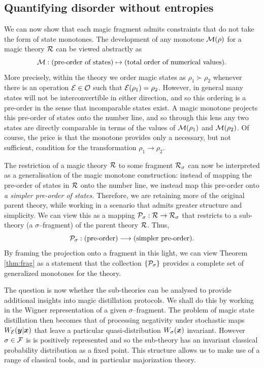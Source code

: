 \documentclass[pra,
aps,
twocolumn,
superscriptaddress,
groupedaddress,
nofootinbib,
reprint
]{revtex4-1}
\begin{document}
\subsection{Quantifying disorder without entropies}
\label{sec:major}

We can now show that each magic fragment admits constraints that do not take the form of state monotones. The development of any monotone $\M(\rho)$ for a magic theory $\R$ can be viewed abstractly as
\begin{equation}
\M : \mbox{(pre-order of states)} \mapsto \mbox{(total order of numerical values).} \nonumber
\end{equation}
More precisely, within the theory we order magic states as $\rho_1 \succ \rho_2$ whenever there is an operation $\E \in \O$ such that $\E(\rho_1) = \rho_2$. However, in general many states will not be interconvertible in either direction, and so this ordering is a pre-order in the sense that incomparable states exist. A magic monotone projects this pre-order of states onto the number line, and so through this lens any two states are directly comparable in terms of the values of $\M(\rho_1)$ and $\M(\rho_2)$. Of course, the price is that the monotone provides only a necessary, but not sufficient, condition for the transformation $\rho_1 \rightarrow \rho_2$.

The restriction of a magic theory $\R$ to some fragment $\R_\sigma$ can now be interpreted as a generalisation of the magic monotone construction: instead of mapping the pre-order of states in $\R$ onto the number line, we instead map this pre-order onto \emph{a simpler pre-order of states.} Therefore, we are retaining more of the original parent theory, while working in a scenario that admits greater structure and simplicity. We can view this as a mapping $\P_\sigma: \R \rightarrow \R_\sigma$ that restricts to a sub-theory (a $\sigma$--fragment) of the parent theory $\R$. Thus,
\begin{equation}
\P_\sigma: \mbox{(pre-order)} \longrightarrow \mbox{(simpler pre-order).}
\end{equation}
By framing the projection onto a fragment in this light, we can view Theorem \ref{thm:frag} as a statement that the collection $\{\P_\sigma\}$ provides a complete set of generalized monotones for the theory.

The question is now whether the sub-theories can be analysed to provide additional insights into magic distillation protocols. We shall do this by working in the Wigner representation of a given $\sigma$--fragment. The problem of magic state distillation then becomes that of processing negativity under stochastic maps $W_{\E}( \y |\x)$ that leave a particular quasi-distribution $W_\sigma(\x)$ invariant. However $\sigma \in \F$ is is positively represented and so the sub-theory has an invariant classical probability distribution as a fixed point. This structure allows us to make use of a range of classical tools, and in particular majorization theory.
\end{document}
